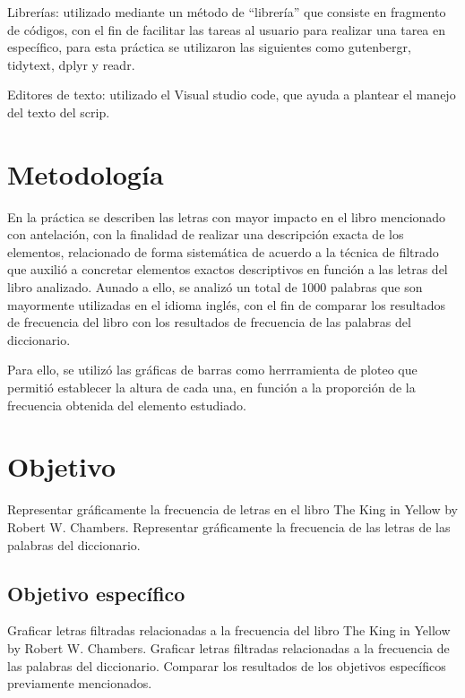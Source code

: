 \documentclass{article}
\begin{document}
Librerías: utilizado mediante un método de “librería” que consiste en fragmento de códigos, con el fin de facilitar las tareas al usuario para realizar una tarea en específico, para esta práctica se utilizaron las siguientes como gutenbergr\cite{gutenberg}, tidytext\cite{tidytext}, dplyr\cite{dplyr} y readr\cite{read}.

Editores de texto: utilizado el Visual studio code\cite{Visual_studio_code}, que ayuda a plantear el manejo del texto del scrip. 

\section{Metodología}
En la práctica se describen las letras con mayor impacto en el libro mencionado con antelación, con la finalidad de realizar una descripción exacta de los elementos, relacionado de forma sistemática de acuerdo a la técnica de filtrado que auxilió a concretar elementos exactos descriptivos en función a las letras del libro analizado. Aunado a ello, se analizó un total de 1000 palabras que son mayormente utilizadas en el idioma inglés, con el fin de comparar los resultados de frecuencia del libro con los resultados de frecuencia de las palabras del diccionario.

Para ello, se utilizó las gráficas de barras como herrramienta de ploteo que permitió establecer la altura de cada una, en función a la proporción de la frecuencia obtenida del elemento estudiado.

\section{Objetivo}
Representar gráficamente la frecuencia de letras en el libro The King in Yellow by Robert W. Chambers\cite{The_King_in_Yellow}.
Representar gráficamente la frecuencia de las letras de las palabras del diccionario.
\subsection{Objetivo específico}
Graficar letras filtradas relacionadas a la frecuencia del libro The King in Yellow by Robert W. Chambers\cite{The_King_in_Yellow}.
Graficar letras filtradas relacionadas a la frecuencia de las palabras del diccionario.
Comparar los resultados de los objetivos específicos previamente mencionados.
\end{document}
